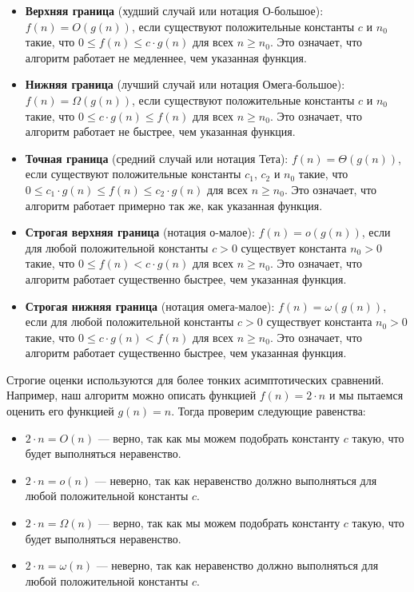 \documentclass[a4paper,12pt]{article}
\begin{document}
\begin{itemize}
    \item \textbf{Верхняя граница} (худший случай или нотация О-большое): $f(n) = O(g(n))$, если существуют положительные константы $c$ и $n_{0}$ такие, что $0 \leq f(n) \leq c \cdot g(n)$ для всех $n \geq n_{0}$. Это означает, что алгоритм работает не медленнее, чем указанная функция.
    
    \item \textbf{Нижняя граница} (лучший случай или нотация Омега-большое): $f(n) = \Omega(g(n))$, если существуют положительные константы $c$ и $n_{0}$ такие, что $0 \leq c \cdot g(n) \leq f(n)$ для всех $n \geq n_{0}$. Это означает, что алгоритм работает не быстрее, чем указанная функция.
    
    \item \textbf{Точная граница} (средний случай или нотация Тета): $f(n) = \Theta(g(n))$, если существуют положительные константы $c_{1}$, $c_{2}$ и $n_{0}$ такие, что $0 \leq c_{1} \cdot g(n) \leq f(n) \leq c_{2} \cdot g(n)$ для всех $n \geq n_{0}$. Это означает, что алгоритм работает примерно так же, как указанная функция.
    
    \item \textbf{Строгая верхняя граница} (нотация о-малое): $f(n) = o(g(n))$, если для любой положительной константы $c > 0$ существует константа $n_{0} > 0$ такие, что $0 \leq f(n) < c \cdot g(n)$ для всех $n \geq n_{0}$. Это означает, что алгоритм работает существенно быстрее, чем указанная функция.
    
    \item \textbf{Строгая нижняя граница} (нотация омега-малое): $f(n) = \omega(g(n))$, если для любой положительной константы $c > 0$ существует константа $n_{0} > 0$ такие, что $0 \leq c \cdot g(n) < f(n)$ для всех $n \geq n_{0}$. Это означает, что алгоритм работает существенно быстрее, чем указанная функция.
\end{itemize}

Строгие оценки используются для более тонких асимптотических сравнений. Например, наш алгоритм можно описать функцией $f(n) = 2 \cdot n$ и мы пытаемся оценить его функцией $g(n) = n$. Тогда проверим следующие равенства:

\begin{itemize}
    \item $2 \cdot n = O(n)$ --- верно, так как мы можем подобрать константу $c$ такую, что будет выполняться неравенство.
    \item $2 \cdot n = o(n)$ --- неверно, так как неравенство должно выполняться для любой положительной константы $c$.
    \item $2 \cdot n = \Omega(n)$ --- верно, так как мы можем подобрать константу $c$ такую, что будет выполняться неравенство.
    \item $2 \cdot n = \omega(n)$ --- неверно, так как неравенство должно выполняться для любой положительной константы $c$.
\end{itemize}
\end{document}
